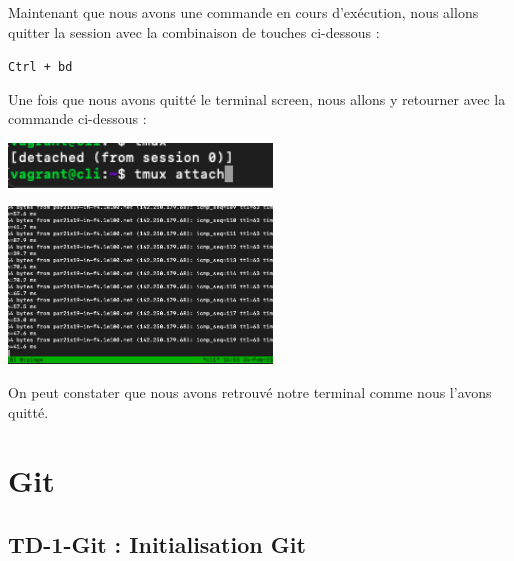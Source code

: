 \documentclass[12pt]{article}
\begin{document}
\vspace{0.3cm}

Maintenant que nous avons une commande en cours d'exécution, nous allons quitter la session avec la combinaison de touches ci-dessous :

\texttt{Ctrl + bd}

\newpage

\vspace{0.3cm}

Une fois que nous avons quitté le terminal screen, nous allons y retourner avec la commande ci-dessous : 

\vspace{0.3cm}

\begin{center}
  \includegraphics[width=7cm]{Images-Client-SSH/Image-TD-SSH-9/tmux-attach.png}
\end{center}

\vspace{0.3cm}

\begin{center}
  \includegraphics[width=7cm]{Images-Client-SSH/Image-TD-SSH-9/return-tmux.png}
\end{center}

\vspace{0.3cm}

On peut constater que nous avons retrouvé notre terminal comme nous l'avons quitté.




\newpage

\section{Git}

\subsection{TD-1-Git : Initialisation Git}
\end{document}
